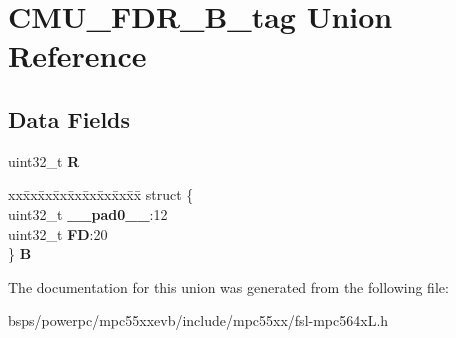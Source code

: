 \hypertarget{unionCMU__FDR__32B__tag}{}\section{C\+M\+U\+\_\+\+F\+D\+R\+\_\+B\+\_\+tag Union Reference}
\label{unionCMU__FDR__32B__tag}
\subsection*{Data Fields}
\begin{DoxyCompactItemize}
\item 
\mbox{\label{unionCMU__FDR__32B__tag_a0394305566e5ccb164c0c5167eb4b6c6}} 
uint32\+\_\+t {\bfseries R}
\item 
\mbox{\label{unionCMU__FDR__32B__tag_ade4f3ae8aae566dbf4eec0b74dc69fb2}} 
\begin{tabbing}
xx\=xx\=xx\=xx\=xx\=xx\=xx\=xx\=xx\=\kill
struct \{\\
\>uint32\_t {\bfseries \_\_pad0\_\_}:12\\
\>uint32\_t {\bfseries FD}:20\\
\} {\bfseries B}\\

\end{tabbing}\end{DoxyCompactItemize}


The documentation for this union was generated from the following file\+:\begin{DoxyCompactItemize}
\item 
bsps/powerpc/mpc55xxevb/include/mpc55xx/fsl-\/mpc564x\+L.\+h\end{DoxyCompactItemize}
